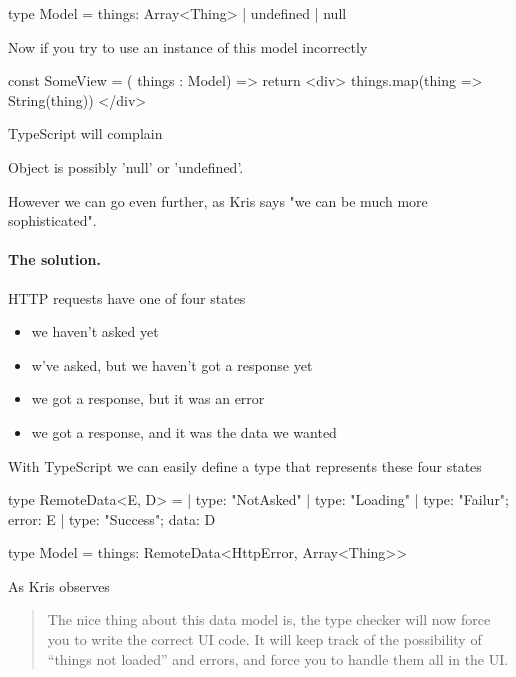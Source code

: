 \documentclass[12pt]{article}
\theoremstyle{definition}
\newenvironment{code}
  {\vspace{0.5cm} \VerbatimEnvironment\begin{typescriptcode}}
  {\end{typescriptcode} \vspace{0.2cm}}
\begin{document}
\begin{code}
type Model = {
  things: Array<Thing> | undefined | null
}
\end{code}

Now if you try to use an instance of this model incorrectly

\begin{code}
const SomeView = ({ things }: Model) => {
  return <div>
    { things.map(thing => String(thing)) }
  </div>
}
\end{code}

TypeScript will complain

\begin{code}
[ts] Object is possibly 'null' or 'undefined'.
\end{code}

However we can go even further, as Kris says "we can be much more sophisticated".

\paragraph{The solution.}

HTTP requests have one of four states

\begin{itemize}
  \item we haven't asked yet
  \item w've asked, but we haven't got a response yet
  \item we got a response, but it was an error
  \item we got a response, and it was the data we wanted
\end{itemize}

With TypeScript we can easily define a type that represents these four states

\begin{code}
type RemoteData<E, D> =
  | { type: "NotAsked" }
  | { type: "Loading" }
  | { type: "Failur"; error: E }
  | { type: "Success"; data: D }

type Model = {
  things: RemoteData<HttpError, Array<Thing>>
}
\end{code}

As Kris observes

\begin{quote}
The nice thing about this data model is, the type checker will now force you to write the correct UI code.
It will keep track of the possibility of “things not loaded” and errors, and force you to handle them all in the UI.
\end{quote}
\end{document}
